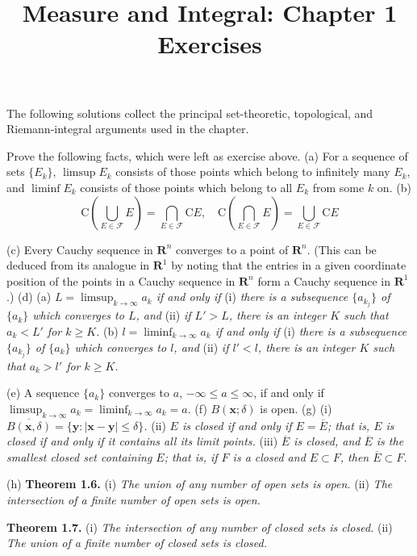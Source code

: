 \documentclass[12pt]{article}
\title{Measure and Integral: Chapter 1 Exercises}
\date{}
\theoremstyle{definition}
\begin{document}
\maketitle
\noindent The following solutions collect the principal set-theoretic, topological, and Riemann-integral arguments used in the chapter.

Prove the following facts, which were left as exercise above.
(a) For a sequence of sets $\{E_k\}$, $\limsup E_k$ consists of those points which belong to infinitely many $E_k$, and $\liminf E_k$ consists of those points which belong to all $E_k$ from some $k$ on.
(b) 
$$
\mathrm{C}\left(\bigcup_{E\in\mathcal{F}}E\right)=\bigcap_{E\in\mathcal{F}}\mathrm{C}E,\quad
\mathrm{C}\left(\bigcap_{E\in\mathcal{F}}E\right)=\bigcup_{E\in\mathcal{F}}\mathrm{C}E
$$

(c) Every Cauchy sequence in $\mathbf{R}^n$ converges to a point of $\mathbf{R}^n$. (This can be deduced from its analogue in $\mathbf{R}^1$ by noting that the entries in a given coordinate position of the points in a Cauchy sequence in $\mathbf{R}^n$ form a Cauchy sequence in $\mathbf{R}^1$.)
(d) 
(a) \textit{$L=\limsup_{k\to\infty}a_k$ if and only if} (i) \textit{there is a subsequence $\{a_{k_j}\}$ of $\{a_k\}$ which converges to $L$, and} (ii) \textit{if $L'>L$, there is an integer $K$ such that $a_k<L'$ for $k\ge K$.}
(b) \textit{$l=\liminf_{k\to\infty}a_k$ if and only if} (i) \textit{there is a subsequence $\{a_{k_j}\}$ of $\{a_k\}$ which converges to $l$, and} (ii) \textit{if $l'<l$, there is an integer $K$ such that $a_k>l'$ for $k\ge K$.}

(e) A sequence $\{a_k\}$ converges to $a$, $-\infty\le a\le\infty$, if and only if $\limsup_{k\to\infty}a_k=\liminf_{k\to\infty}a_k=a$.
(f)  $B(\mathbf{x};\delta)$ is open.
(g) 
(i) \textit{$\overline{B(\mathbf{x},\delta)}=\{\mathbf{y}:\left\vert\mathbf{x}-\mathbf{y}\right\vert\le\delta\}$.}
(ii) \textit{$E$ is closed if and only if $E=\overline{E}$; that is, $E$ is closed if and only if it contains all its limit points.}
(iii) \textit{$\overline{E}$ is closed, and $\overline{E}$ is the smallest closed set containing $E$; that is, if $F$ is a closed and $E\subset F$, then $\overline{E}\subset F$.}

(h) 
\textbf{Theorem 1.6.}
(i) \textit{The union of any number of open sets is open.}
(ii) \textit{The intersection of a finite number of open sets is open.}

\textbf{Theorem 1.7.}
(i) \textit{The intersection of any number of closed sets is closed.}
(ii) \textit{The union of a finite number of closed sets is closed.}
\end{document}
